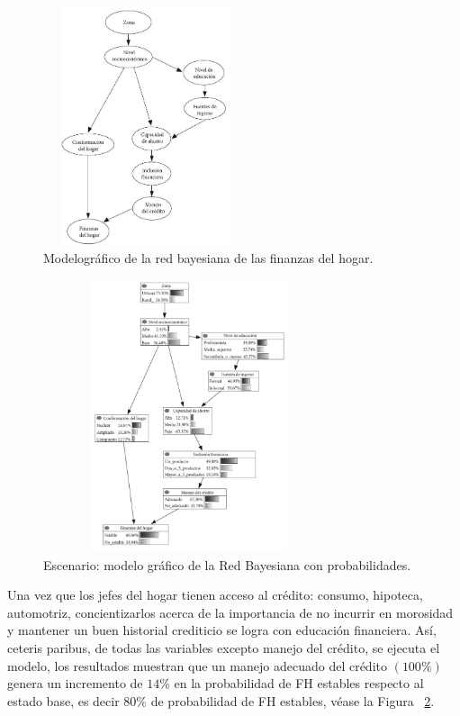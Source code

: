 \documentclass[10pt,conference]{IEEEtran}
\begin{document}
\begin{enumerate}
\begin{figure}[H]
\begin{center}
\includegraphics[width=6cm, height=7cm]{figuras/RD2.PNG}
\caption{Modelográfico de la red bayesiana de las finanzas del hogar.}
\label{RB2} 
\end{center}
\end{figure}

\begin{figure}[H]
\begin{center}
\includegraphics[width=8.5cm, height=8cm]{figuras/RB22.PNG}
\caption{Escenario: modelo gráfico de la Red Bayesiana con probabilidades.}
\label{RB22} 
\end{center}
\end{figure}

Una vez que los jefes del hogar tienen acceso al crédito: consumo, hipoteca, automotriz, concientizarlos acerca de la importancia de no incurrir en morosidad y mantener un buen historial crediticio se logra con educación financiera. Así, ceteris paribus, de todas las variables excepto manejo del crédito, se ejecuta el modelo, los resultados muestran que un manejo adecuado del crédito $(100\%)$ genera un incremento de $14\%$ en la probabilidad de FH estables respecto al estado base, es decir $80\%$ de probabilidad de FH estables, véase la Figura ~\ref{RB22}.


\end{enumerate}
\end{document}
